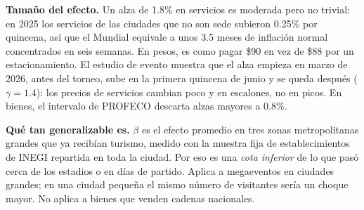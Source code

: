 \documentclass[11pt,letterpaper]{article}
\begin{document}
\textbf{Tamaño del efecto.} Un alza de 1.8\% en servicios es moderada pero no trivial: en 2025 los
servicios de las ciudades que no son sede subieron 0.25\% por quincena, así que el Mundial
equivale a unos 3.5 meses de inflación normal concentrados en seis semanas. En pesos, es como
pagar \$90 en vez de \$88 por un estacionamiento. El estudio de evento muestra que el alza empieza
en marzo de 2026, antes del torneo, sube en la primera quincena de junio y se queda después
($\gamma=1.4$): los precios de servicios cambian poco y en escalones, no en picos. En bienes, el
intervalo de PROFECO descarta alzas mayores a 0.8\%.

\textbf{Qué tan generalizable es.} $\beta$ es el efecto promedio en tres zonas metropolitanas grandes
que ya recibían turismo, medido con la muestra fija de establecimientos de INEGI repartida en toda
la ciudad. Por eso es una \emph{cota inferior} de lo que pasó cerca de los estadios o en días de
partido. Aplica a megaeventos en ciudades grandes; en una ciudad pequeña el mismo número de
visitantes sería un choque mayor. No aplica a bienes que venden cadenas nacionales.
\end{document}
